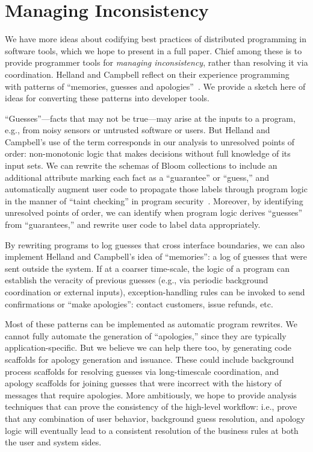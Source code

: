 \section{Managing Inconsistency}
We have more ideas about codifying best practices of distributed programming in
software tools, which we hope to present in a full paper.  Chief among these is
to provide programmer tools for \emph{managing inconsistency}, rather than
resolving it via coordination.  Helland and Campbell reflect on their experience
programming with patterns of ``memories, guesses and
apologies''~\cite{quicksand}.  We provide a sketch here of ideas for converting
these patterns into developer tools.

``Guesses''---facts that may not be true---may arise at the inputs to a program,
e.g., from noisy sensors or untrusted software or users.  But Helland and
Campbell's use of the term corresponds in our analysis to unresolved points of
order: non-monotonic logic that makes decisions without full knowledge of its
input sets.  We can rewrite the schemas of Bloom collections to include an
additional attribute marking each fact as a ``guarantee'' or ``guess,'' and
automatically augment user code to propagate those labels through program logic
in the manner of ``taint checking'' in program security~\cite{taint,asbestos}.
Moreover, by identifying unresolved points of order, we can identify when
program logic derives ``guesses'' from ``guarantees,'' and rewrite user code to
label data appropriately.

By rewriting programs to log guesses that cross interface boundaries, we can
also implement Helland and Campbell's idea of ``memories'': a log of guesses
that were sent outside the system.  If at a coarser time-scale, the logic of a
program can establish the veracity of previous guesses (e.g., via periodic
background coordination or external inputs), exception-handling rules can be
invoked to send confirmations or ``make apologies'': contact customers, issue
refunds, etc.

Most of these patterns can be implemented as automatic program rewrites.  We
cannot fully automate the generation of ``apologies,'' since they are typically
application-specific.  But we believe we can help there too, by generating code
scaffolds for apology generation and issuance.  These could include background
process scaffolds for resolving guesses via long-timescale coordination, and
apology scaffolds for joining guesses that were incorrect with the history of
messages that require apologies.  More ambitiously, we hope to provide analysis
techniques that can prove the consistency of the high-level workflow: i.e.,
prove that any combination of user behavior, background guess resolution, and
apology logic will eventually lead to a consistent resolution of the business
rules at both the user and system sides.
